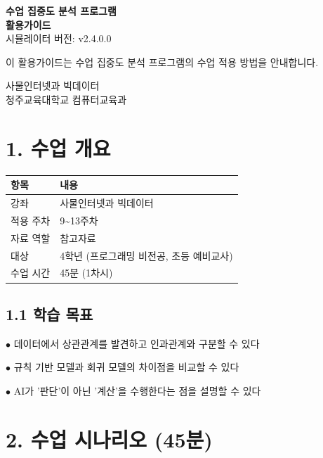 \documentclass[11pt,a4paper]{article}
\begin{document}
\begin{titlepage}
\centering
\vspace*{3cm}
{\Huge\bfseries\color{primary} 수업 집중도 분석 프로그램}\\[0.5cm]
{\Huge\bfseries\color{primary} 활용가이드}
\\[1.5cm]
{\Large 시뮬레이터 버전: v2.4.0.0}
\\[2cm]
\begin{tcolorbox}[summarybox]
\centering
{\large 이 활용가이드는 수업 집중도 분석 프로그램의 수업 적용 방법을 안내합니다.}
\end{tcolorbox}
\vfill
{\large 사물인터넷과 빅데이터}\\[0.3cm]
{\large 청주교육대학교 컴퓨터교육과}
\vspace{1cm}
\end{titlepage}

\section*{1. 수업 개요}

\begin{center}
\renewcommand{\arraystretch}{1.4}
\begin{tabular}{|p{2.8cm}|p{12.2cm}|}
\hline
\rowcolor{tableheader}
\textbf{항목} & \textbf{내용} \\
\hline
강좌 & 사물인터넷과 빅데이터 \\
\hline
적용 주차 & 9\textasciitilde{}13주차 \\
\hline
자료 역할 & 참고자료 \\
\hline
대상 & 4학년 (프로그래밍 비전공, 초등 예비교사) \\
\hline
수업 시간 & 45분 (1차시) \\
\hline
\end{tabular}
\end{center}

\subsection*{1.1 학습 목표}

$\bullet$ 데이터에서 상관관계를 발견하고 인과관계와 구분할 수 있다

$\bullet$ 규칙 기반 모델과 회귀 모델의 차이점을 비교할 수 있다

$\bullet$ AI가 '판단'이 아닌 '계산'을 수행한다는 점을 설명할 수 있다



\section*{2. 수업 시나리오 (45분)}
\end{document}
